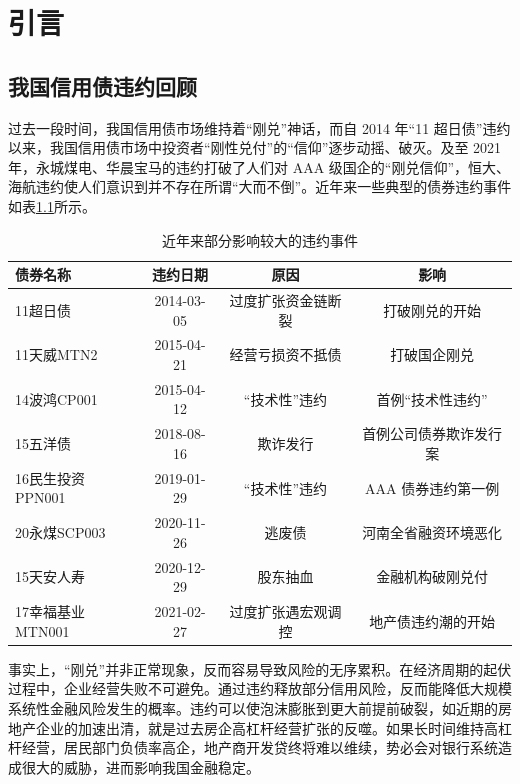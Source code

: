 
\chapter{引言}

\section{我国信用债违约回顾}

过去一段时间，我国信用债市场维持着“刚兑”神话，而自 2014 年“11 超日债”违约以来，我国信用债市场中投资者“刚性兑付”的“信仰”逐步动摇、破灭。及至 2021 年，永城煤电、华晨宝马的违约打破了人们对 AAA 级国企的“刚兑信仰”，恒大、海航违约使人们意识到并不存在所谓“大而不倒”。近年来一些典型的债券违约事件如表\ref{tab:defaults_in_history}所示。

\begin{table}[ht]
	\caption{近年来部分影响较大的违约事件}
	\centering
	\begin{tabular}{lccc}
		债券名称         & 违约日期   & 原因               & 影响                   \\ \hline
		11超日债         & 2014-03-05 & 过度扩张资金链断裂 & 打破刚兑的开始         \\
		11天威MTN2       & 2015-04-21 & 经营亏损资不抵债   & 打破国企刚兑           \\
		14波鸿CP001      & 2015-04-12 & “技术性”违约       & 首例“技术性违约”       \\
		15五洋债         & 2018-08-16 & 欺诈发行           & 首例公司债券欺诈发行案 \\
		16民生投资PPN001 & 2019-01-29 & “技术性”违约       & AAA 债券违约第一例     \\
		20永煤SCP003     & 2020-11-26 & 逃废债             & 河南全省融资环境恶化   \\
		15天安人寿       & 2020-12-29 & 股东抽血           & 金融机构破刚兑付       \\
		17幸福基业MTN001 & 2021-02-27 & 过度扩张遇宏观调控 & 地产债违约潮的开始     \\
	\end{tabular}
	\label{tab:defaults_in_history}
\end{table}
事实上，“刚兑”并非正常现象，反而容易导致风险的无序累积。在经济周期的起伏过程中，企业经营失败不可避免。通过违约释放部分信用风险，反而能降低大规模系统性金融风险发生的概率。违约可以使泡沫膨胀到更大前提前破裂，如近期的房地产企业的加速出清，就是过去房企高杠杆经营扩张的反噬。如果长时间维持高杠杆经营，居民部门负债率高企，地产商开发贷终将难以维续，势必会对银行系统造成很大的威胁，进而影响我国金融稳定。

